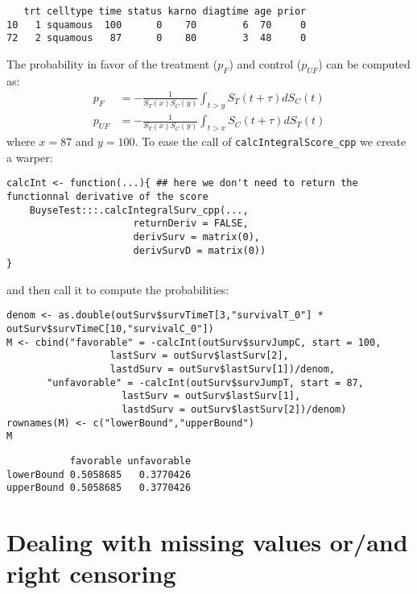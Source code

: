 \documentclass[12pt]{article}
\begin{document}
\begin{verbatim}
   trt celltype time status karno diagtime age prior
10   1 squamous  100      0    70        6  70     0
72   2 squamous   87      0    80        3  48     0
\end{verbatim}

The probability in favor of the treatment (\(p_F\)) and control (\(p_{UF}\)) can be computed
as:
\begin{align*}
p_F &= -\frac{1}{S_T(x)S_C(y)}\int_{t>y} S_T(t+\tau) dS_C(t) \\
p_{UF} &= -\frac{1}{S_T(x)S_C(y)}\int_{t>x} S_C(t+\tau) dS_T(t)
\end{align*}
where \(x=87\) and \(y=100\). To ease the call of \texttt{calcIntegralScore\_cpp} we create a warper:
\lstset{language=r,label= ,caption= ,captionpos=b,numbers=none}
\begin{lstlisting}
calcInt <- function(...){ ## here we don't need to return the functionnal derivative of the score 
    BuyseTest:::.calcIntegralSurv_cpp(..., 
				      returnDeriv = FALSE, 
				      derivSurv = matrix(0), 
				      derivSurvD = matrix(0))
}
\end{lstlisting}

and then call it to compute the probabilities:
\lstset{language=r,label= ,caption= ,captionpos=b,numbers=none}
\begin{lstlisting}
denom <- as.double(outSurv$survTimeT[3,"survivalT_0"] * outSurv$survTimeC[10,"survivalC_0"])
M <- cbind("favorable" = -calcInt(outSurv$survJumpC, start = 100, 
				  lastSurv = outSurv$lastSurv[2],
				  lastdSurv = outSurv$lastSurv[1])/denom,
	   "unfavorable" = -calcInt(outSurv$survJumpT, start = 87, 
				    lastSurv = outSurv$lastSurv[1],
				    lastdSurv = outSurv$lastSurv[2])/denom)
rownames(M) <- c("lowerBound","upperBound")
M
\end{lstlisting}

\begin{verbatim}
           favorable unfavorable
lowerBound 0.5058685   0.3770426
upperBound 0.5058685   0.3770426
\end{verbatim}

\clearpage

\section{Dealing with missing values or/and right censoring}
\label{sec:org6870562}
\end{document}
